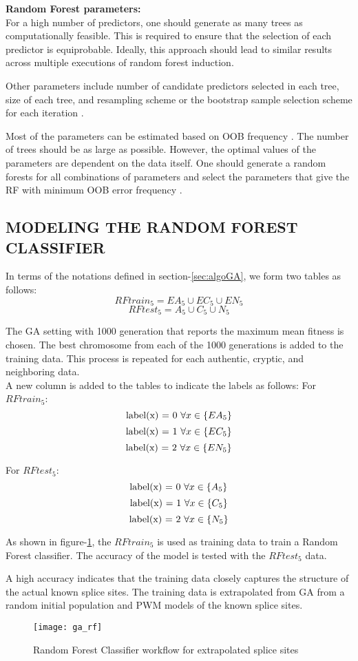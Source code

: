 	\textbf{Random Forest parameters:} \\
	For a high number of predictors, one should generate as many trees as computationally feasible. This is required to ensure that the selection of each predictor is equiprobable. Ideally, this approach should lead to similar results across multiple executions of random forest induction. \par
	Other parameters include number of candidate predictors selected in each tree, size of each tree, and resampling scheme or the bootstrap sample selection scheme for each iteration \cite{rf1}. \par
	Most of the parameters can be estimated based on OOB frequency . The number of trees should be as large as possible. However, the optimal values of the parameters are dependent on the data itself. One should generate a random forests for all combinations of parameters and select the parameters that give the RF with minimum OOB error frequency \cite{rf1}.
	
	\subsection{MODELING THE RANDOM FOREST CLASSIFIER}
	In terms of the notations defined in section-\ref{sec:algoGA}, we form two tables as follows:
	$$ RFtrain_5 = EA_5 \cup EC_5 \cup EN_5$$
	$$ RFtest_5 = A_5 \cup C_5 \cup N_5$$
	
	The GA setting with 1000 generation that reports the maximum mean fitness is chosen. The best chromosome from each of the 1000 generations is added to the training data. This process is repeated for each authentic, cryptic, and neighboring data.\\
	A new column is added to the tables to indicate the labels as follows:
	For $RFtrain_5$:
	$$ \textnormal{label(x) = 0 }\forall x \in \{EA_5\} $$
	$$ \textnormal{label(x) = 1 }\forall x \in \{EC_5\} $$
	$$ \textnormal{label(x) = 2 }\forall x \in \{EN_5\} $$
	
	For $RFtest_5$:
	$$ \textnormal{label(x) = 0 }\forall x \in \{A_5\} $$
	$$ \textnormal{label(x) = 1 }\forall x \in \{C_5\} $$
	$$ \textnormal{label(x) = 2 }\forall x \in \{N_5\} $$
	
	As shown in figure-\ref{fig:ga_rf}, the $RFtrain_5$ is used as training data to train a Random Forest classifier. The accuracy of the model is tested with the $RFtest_5$ data. \par
	A high accuracy indicates that the training data closely captures the structure of the actual known splice sites. The training data is extrapolated from GA from a random initial population and PWM models of the known splice sites.
	\begin{figure}[H]
		\texttt{[image: ga\_rf]}
		\caption{Random Forest Classifier workflow for extrapolated splice sites}
		\centering
		\label{fig:ga_rf}
	\end{figure}
	